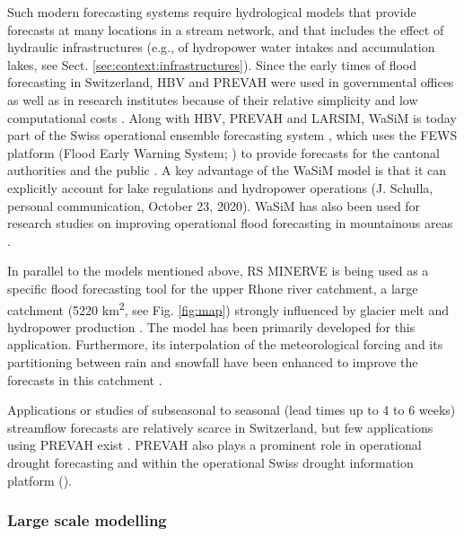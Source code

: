 \documentclass[10pt,a4paper]{article}
\begin{document}
Such modern forecasting systems require hydrological models that provide forecasts at many locations in a stream network, and that includes the effect of hydraulic infrastructures (e.g., of hydropower water intakes and accumulation lakes, see Sect. \ref{sec:context:infrastructures}). Since the early times of flood forecasting in Switzerland, HBV and PREVAH were used in governmental offices \citep{Jasper2016} as well as in research institutes because of their relative simplicity and low computational costs \citep{Verbunt2006, Addor2011, Murphy2019, Antonetti2019}. Along with HBV, PREVAH and LARSIM, WaSiM is today part of the Swiss operational ensemble forecasting system \citep{Jasper2016}, which uses the FEWS platform (Flood Early Warning System; \citealp{Werner2013}) to provide forecasts for the cantonal authorities and the public \citep{FOEN2019}. A key advantage of the WaSiM model is that it can explicitly account for lake regulations and hydropower operations (J. Schulla, personal communication, October 23, 2020). WaSiM has also been used for research studies on improving operational flood forecasting in mountainous areas \citep{Jasper2002, Jasper2003, Ahrens2003a, Ahrens2003b}.

In parallel to the models mentioned above, RS MINERVE is being used as a specific flood forecasting tool for the upper Rhone river catchment, a large catchment (5220 km\textsuperscript{2}, see Fig. \ref{fig:map}) strongly influenced by glacier melt and hydropower production \citep{GarciaHernandez2009b, GarciaHernandez2009, Jordan2010}. The model has been primarily developed for this application. Furthermore, its interpolation of the meteorological forcing and its partitioning between rain and snowfall have been enhanced to improve the forecasts in this catchment \citep{Tobin2011, Tobin2012}.

Applications or studies of subseasonal to seasonal (lead times up to 4 to 6 weeks) streamflow forecasts are relatively scarce in Switzerland, but few applications using PREVAH exist \citep[][]{Monhart2019, Anghileri2019}. PREVAH also plays a prominent role in operational drought forecasting \citep{Fundel2013, JorgHess2015, Bogner2018b} and within the operational Swiss drought information platform (\citealp{Stahli2013}). 


\subsubsection{Large scale modelling}
\label{sec:context:largescale}
\end{document}
